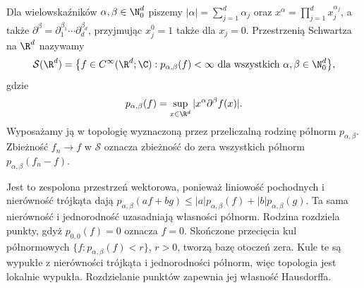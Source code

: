 \begin{definicja}
\label{def:pde8-schwartz}
Dla wielowskaźników $\alpha,\beta\in\N_0^d$ piszemy
$|\alpha|=\sum_{j=1}^d\alpha_j$ oraz
$x^\alpha=\prod_{j=1}^d x_j^{\alpha_j}$, a także
$\partial^\beta=\partial_1^{\beta_1}\cdots\partial_d^{\beta_d}$,
przyjmując $x_j^0=1$ także dla $x_j=0$.
Przestrzenią Schwartza na $\R^d$ nazywamy
\[
 \mathcal S(\R^d)=\bigl\{f\in C^\infty(\R^d;\C):
 p_{\alpha,\beta}(f)<\infty
 \text{ dla wszystkich }\alpha,\beta\in\N_0^d\bigr\},
\]
gdzie
\[
 p_{\alpha,\beta}(f)=\sup_{x\in\R^d}
 |x^\alpha\partial^\beta f(x)|.
\]
Wyposażamy ją w topologię wyznaczoną przez przeliczalną
rodzinę półnorm $p_{\alpha,\beta}$. Zbieżność $f_n\to f$
w $\mathcal S$ oznacza zbieżność do zera wszystkich
półnorm $p_{\alpha,\beta}(f_n-f)$.
\end{definicja}

Jest to zespolona przestrzeń wektorowa, ponieważ
liniowość pochodnych i nierówność trójkąta dają
$p_{\alpha,\beta}(af+bg)\le
|a|p_{\alpha,\beta}(f)+|b|p_{\alpha,\beta}(g)$.
Ta sama nierówność i jednorodność uzasadniają
własności półnorm. Rodzina rozdziela punkty,
gdyż $p_{0,0}(f)=0$ oznacza $f=0$.
Skończone przecięcia kul półnormowych
$\{f:p_{\alpha,\beta}(f)<r\}$, $r>0$,
tworzą bazę otoczeń zera. Kule te są wypukłe
z nierówności trójkąta i jednorodności półnorm,
więc topologia jest lokalnie wypukła.
Rozdzielanie punktów zapewnia jej własność Hausdorffa.

